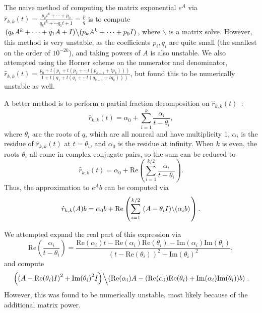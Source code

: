 
The naive method of computing the matrix exponential $e^A$ via
$\hat{r}_{k, k}(t)=\frac{p_kt^k + \cdots + p_0}{q_kt^k + \cdots q_1t +
  1}=\frac{p}{q}$ is to compute
$\left .(q_kA^k + \cdots + q_1A + I)\middle\backslash(p_kA^k + \cdots + p_0 I)\right.$, where
$\backslash$ is a matrix solve. However, this method is very unstable, as the
coefficients $p_i,q_i$ are quite small (the smallest on the order of
$10^{-2k}$), and taking powers of $A$ is also unstable. We also attempted
using the Horner scheme on the numerator and denominator,
$\hat{r}_{k, k}(t)=\frac{p_0 + t(p_1 + t(p_2 + \cdots t(p_{k-1} + tp_k)))}{1 +
  t(q_1 + t(q_2 + \cdots t(q_{k-1} + tq_k)))}$, but found this to be
numerically unstable as well.

A better method is to perform a partial fraction decomposition on $\hat{r}_{k,
  k}(t)$~\cite{pusa2010computing}:
\begin{equation}
\label{eq:part-frac}
  \hat{r}_{k, k}(t) = \alpha_0 + \sum_{i=1}^k \frac{\alpha_i}{t - \theta_i},
\end{equation}
where $\theta_i$ are the roots of $q$, which are all
nonreal and have multiplicity 1, $\alpha_i$ is the residue of
$\hat{r}_{k, k}(t)$ at $t=\theta_i$, and $\alpha_0$ is the residue at
infinity. When $k$ is even, the roots $\theta_i$ all come in complex conjugate
pairs, so the sum can be reduced to
\begin{equation}
  \hat{r}_{k, k}(t) = \alpha_0 + \mathrm{Re}\left(\sum_{i=1}^{k/2}
    \frac{\alpha_i}{t - \theta_i}\right).
\end{equation}
Thus, the approximation to $e^Ab$ can be computed via
\begin{equation}
\label{eq:part-frac-matrix-re}
  \hat{r}_{k, k}(A)b = \alpha_0b + \mathrm{Re}\left(\sum_{i=1}^{k/2} \left. (A -
    \theta_i I)\middle\backslash(\alpha_i b) \right.\right).
\end{equation}

We attempted expand the real part of this expression via
\begin{equation}
\mathrm{Re}\left(\frac{\alpha_i}{t - \theta_i}\right) = \frac{\mathrm{Re}{(\alpha_{i})}t - \mathrm{Re}{(\alpha_{i})} \mathrm{Re}{(\theta_{i})} - \mathrm{Im}{(\alpha_{i})} \mathrm{Im}{(\theta_{i})}}{\left(t - \mathrm{Re}{(\theta_{i})}\right)^{2} + \mathrm{Im}{(\theta_{i})}^{2}},
\end{equation}
and compute
\begin{equation}
  \left.\left(\left(A - \mathrm{Re}{(\theta_{i})I}\right)^{2} +
  \mathrm{Im}{(\theta_{i})}^{2}I\right)\middle\backslash \left(\mathrm{Re}{(\alpha_{i})}A - (\mathrm{Re}{(\alpha_{i})} \mathrm{Re}{(\theta_{i})} + \mathrm{Im}{(\alpha_{i})} \mathrm{Im}{(\theta_{i})})b\right)\right..
\end{equation}
However, this was found to be numerically unstable, most likely because of the
additional matrix power. %

